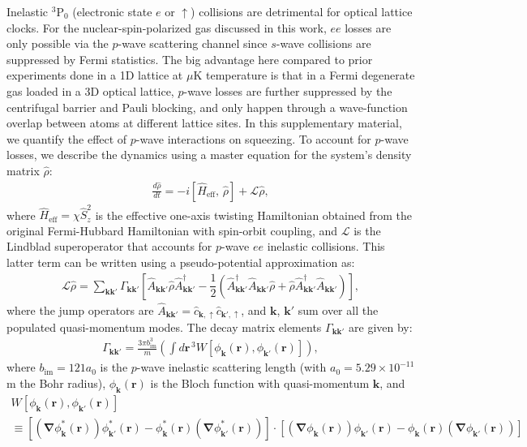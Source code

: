 \documentclass{nature}
\newcommand{\f}[2]{\dfrac{#1}{#2}} %
\newcommand{\p}[1]{\left(#1\right)} %
\renewcommand{\sp}[1]{\left[#1\right]} %
\newcommand{\up}{\uparrow}
\begin{document}
Inelastic $^{3}\text{P}_{0}$ (electronic state $e$ or $\up$) collisions are detrimental for optical lattice clocks. For the  nuclear-spin-polarized gas discussed in this work, $ee$ losses are only possible via the $p$-wave scattering channel since $s$-wave collisions are suppressed by Fermi statistics. The big advantage here compared to  prior experiments done in a 1D lattice at $\mu$K temperature\cite{martin2013quantum} is that in a Fermi  degenerate  gas loaded in a 3D optical lattice, $p$-wave losses are further suppressed by the centrifugal barrier and Pauli blocking, and only happen through a wave-function overlap between atoms at different lattice sites.  In this supplementary material, we quantify the effect of $p$-wave interactions on squeezing. To account for $p$-wave losses, we describe the dynamics  using a master equation for the system's density matrix $\hat{\rho}$:
\begin{align}
  \frac{d\hat{\rho}}{dt}
  = -i [\hat{H}_{\text{eff}},\,\hat{\rho}]
  + \mathcal{L}\hat{\rho},
\end{align}
where $\hat{H}_{\text{eff}}=\chi\hat{S}_z^2$ is the effective one-axis twisting Hamiltonian obtained from  the original Fermi-Hubbard Hamiltonian with spin-orbit coupling, and $\mathcal{L}$ is the Lindblad superoperator that accounts for $p$-wave $ee$ inelastic collisions. This latter term can be written using a pseudo-potential approximation as\cite{rey2014probing}:
\begin{align}
  \mathcal{L}\hat\rho
  = \sum_{{\bm k}{\bm k'}} \Gamma_{{\bm k}{\bm k'}}
  \sp{\hat{A}_{{\bm k}{\bm k'}} \hat\rho\hat{A}_{{\bm k}{\bm k'}}^\dag
  - \f12 \p{\hat{A}_{{\bm k}{\bm k'}}^\dag \hat{A}_{{\bm k}{\bm k'}} \hat\rho
+\hat\rho\hat{A}_{{\bm k}{\bm k'}}^\dag \hat{A}_{{\bm k}{\bm k'}}}},
\end{align}
where the jump operators are $\hat{A}_{{\bm k}{\bm k'}}=\hat{c}_{{\bm k},\up}\hat{c}_{{\bm k'},\up}$, and
$\bm k$, $\bm k'$ sum over all the populated quasi-momentum modes. The decay matrix elements $\Gamma_{{\bm k}{\bm k'}}$ are given by:
\begin{align}
  \Gamma_{{\bm k}{\bm k'}}
  = \frac{3\pi b_{\text{im}}^3 }{m} \p{\int d{\bm r}^{\,3}
    W[\phi_{{\bm k}}({\bm r}),\phi_{{\bm k'}}({\bm r})]},
\end{align}
where $b_{\text{im}} = 121 a_0$\cite{zhang2014spectroscopic, goban2018emergence} is the $p$-wave inelastic scattering length (with $ a_0=5.29\times 10 ^{-11}$ m the Bohr radius), $\phi_{{\bm k}}({\bm r})$ is the Bloch function with quasi-momentum ${\bm k}$, and
\begin{multline}
  W\sp{\phi_{{\bm k}}({\bm r}),\phi_{{\bm k'}}({\bm r})} \\
  \equiv \sp{\p{{\bm \nabla}\phi^{*}_{{\bm k}}(\bm r)}
  \phi^{*}_{{\bm k'}}(\bm r)-\phi^{*}_{{\bm k}}(\bm r)
  \p{{\bm \nabla}\phi^{*}_{{\bm k'}}(\bm r)}}
  \cdot\sp{\p{{\bm \nabla}\phi_{{\bm k}}(\bm r)}
  \phi_{{\bm k'}}(\bm r)-\phi_{{\bm k}}(\bm r)
  \p{{\bm \nabla}\phi_{{\bm k'}}(\bm r)}}
\end{multline}
\end{document}
